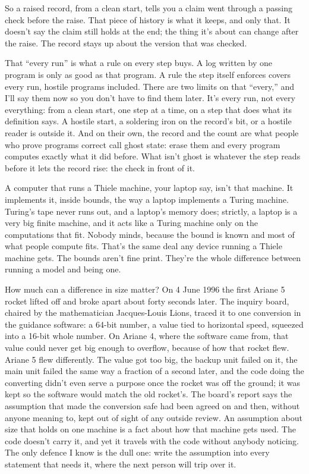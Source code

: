 \documentclass[11pt,twoside]{article}
\theoremstyle{thielethm}
\theoremstyle{thieledef}
\theoremstyle{thieledef}
\theoremstyle{thieledef}
\theoremstyle{thielethm}
\theoremstyle{thieleobs}
\theoremstyle{thielethm}
\begin{document}
So a raised record, from a clean start, tells you a claim went through a passing check before the raise. That piece of history is what it keeps, and only that. It doesn't say the claim still holds at the end; the thing it's about can change after the raise. The record stays up about the version that was checked.

That ``every run'' is what a rule on every step buys. A log written by one program is only as good as that program. A rule the step itself enforces covers every run, hostile programs included. There are two limits on that ``every,'' and I'll say them now so you don't have to find them later. It's every run, not every everything: from a clean start, one step at a time, on a step that does what its definition says. A hostile start, a soldering iron on the record's bit, or a hostile reader is outside it. And on their own, the record and the count are what people who prove programs correct call ghost state: erase them and every program computes exactly what it did before. What isn't ghost is whatever the step reads before it lets the record rise: the check in front of it.

A computer that runs a Thiele machine, your laptop say, isn't that machine. It implements it, inside bounds, the way a laptop implements a Turing machine. Turing's tape never runs out, and a laptop's memory does; strictly, a laptop is a very big finite machine, and it acts like a Turing machine only on the computations that fit. Nobody minds, because the bound is known and most of what people compute fits. That's the same deal any device running a Thiele machine gets. The bounds aren't fine print. They're the whole difference between running a model and being one.

How much can a difference in size matter? On 4 June 1996 the first Ariane 5 rocket lifted off and broke apart about forty seconds later. The inquiry board, chaired by the mathematician Jacques-Louis Lions, traced it to one conversion in the guidance software: a 64-bit number, a value tied to horizontal speed, squeezed into a 16-bit whole number. On Ariane 4, where the software came from, that value could never get big enough to overflow, because of how that rocket flew. Ariane 5 flew differently. The value got too big, the backup unit failed on it, the main unit failed the same way a fraction of a second later, and the code doing the converting didn't even serve a purpose once the rocket was off the ground; it was kept so the software would match the old rocket's. The board's report says the assumption that made the conversion safe had been agreed on and then, without anyone meaning to, kept out of sight of any outside review. An assumption about size that holds on one machine is a fact about how that machine gets used. The code doesn't carry it, and yet it travels with the code without anybody noticing. The only defence I know is the dull one: write the assumption into every statement that needs it, where the next person will trip over it.
\end{document}
